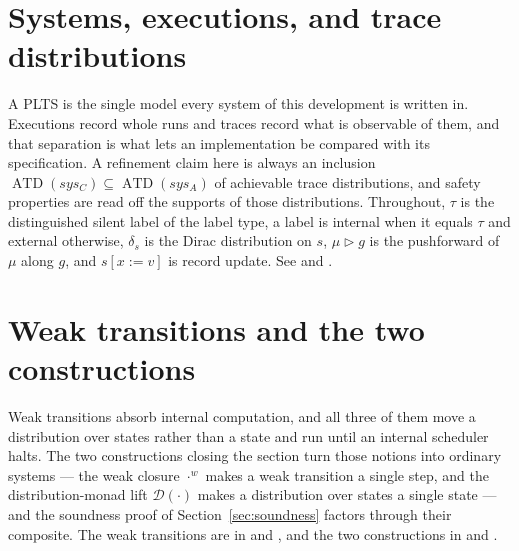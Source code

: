 
\section{Systems, executions, and trace distributions}

A PLTS is the single model every system of this development is written in.
Executions record whole runs and traces record what is observable of them, and that separation is what lets an implementation be compared with its specification.
A refinement claim here is always an inclusion $\operatorname{ATD}(sys_C) \subseteq \operatorname{ATD}(sys_A)$ of achievable trace distributions, and safety properties are read off the supports of those distributions.
Throughout, $\tau$ is the distinguished silent label of the label type, a label is internal when it equals $\tau$ and external otherwise, $\delta_s$ is the Dirac distribution on $s$, $\mu \triangleright g$ is the pushforward of $\mu$ along $g$, and $s[x := v]$ is record update.
See  and .









\section{Weak transitions and the two constructions}

Weak transitions absorb internal computation, and all three of them move a distribution over states rather than a state and run until an internal scheduler halts.
The two constructions closing the section turn those notions into ordinary systems --- the weak closure $\cdot^w$ makes a weak transition a single step, and the distribution-monad lift $\mathcal{D}(\cdot)$ makes a distribution over states a single state --- and the soundness proof of Section~\ref{sec:soundness} factors through their composite.
The weak transitions are in  and , and the two constructions in  and .

